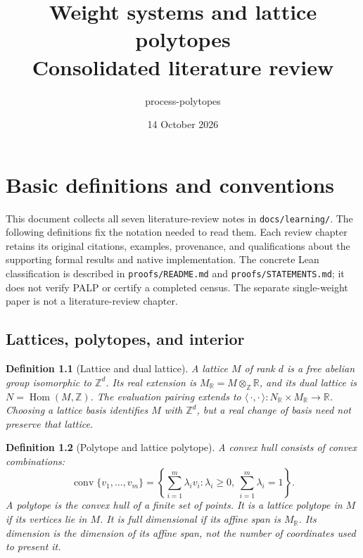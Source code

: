 \documentclass[11pt,a4paper,oneside]{report}
\title{Weight systems and lattice polytopes\\[0.5em]
  \large Consolidated literature review}
\author{process-polytopes}
\date{14 October 2026}
\newtheorem{definition}{Definition}[chapter]
\begin{document}
\maketitle
\tableofcontents

\chapter{Basic definitions and conventions}
\label{basic-definitions}

This document collects all seven literature-review notes in
\texttt{docs/learning/}. The following definitions fix the notation needed
to read them. Each review chapter retains its original citations, examples,
provenance, and qualifications about the supporting formal results and native
implementation. The concrete Lean classification is described in
\texttt{proofs/README.md} and \texttt{proofs/STATEMENTS.md}; it does not verify
PALP or certify a completed census. The separate single-weight paper is not a
literature-review chapter.

\section{Lattices, polytopes, and interior}

\begin{definition}[Lattice and dual lattice]
A lattice \(M\) of rank \(d\) is a free abelian group isomorphic to
\(\mathbb{Z}^{d}\). Its real extension is
\(M_{\mathbb{R}}=M\otimes_{\mathbb{Z}}\mathbb{R}\), and its dual lattice is
\(N=\operatorname{Hom}(M,\mathbb{Z})\).
The evaluation pairing extends to
\(\langle\,\cdot,\cdot\,\rangle:N_{\mathbb{R}}\times M_{\mathbb{R}}
\longrightarrow\mathbb{R}\).
Choosing a lattice basis identifies \(M\) with \(\mathbb{Z}^{d}\), but a real
change of basis need not preserve that lattice.
\end{definition}

\begin{definition}[Polytope and lattice polytope]
A convex hull consists of convex combinations:
\[
  \operatorname{conv}\{v_1,\ldots,v_m\}
   =\left\{\sum_{i=1}^{m}\lambda_i v_i:
       \lambda_i\geq0,\ \sum_{i=1}^{m}\lambda_i=1\right\}.
\]
A polytope is the convex hull of a finite set of points. It is a
\emph{lattice polytope in \(M\)} if its vertices lie in \(M\).
It is full dimensional if its affine span is \(M_{\mathbb{R}}\).
Its dimension is the dimension of its affine span, not the number of
coordinates used to present it.
\end{definition}
\end{document}

